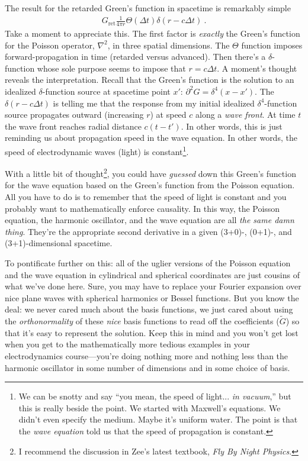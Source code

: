 The result for the retarded Green's function in spacetime is remarkably simple
\begin{align}
	G_\text{ret} \frac{1}{4\pi r} \Theta(\Delta t) \delta(r-c\Delta t) \ .
\end{align}
Take a moment to appreciate this. The first factor is \emph{exactly} the Green's function for the Poisson operator, $\nabla^2$, in three spatial dimensions. The $\Theta$ function imposes forward-propagation in time (retarded versus advanced). Then there's a $\delta$-function whose sole purpose seems to impose that $r = c\Delta t$. A moment's thought reveals the interpretation. Recall that the Green's function is the solution to an idealized $\delta$-function source at spacetime point $x'$: $\partial^2 G = \delta^4(x-x')$. The $\delta(r-c\Delta t)$ is telling me that the response from my initial idealized $\delta^4$-function source propagates outward (increasing $r$) at speed $c$ along a \emph{wave front}. At time $t$ the wave front reaches radial distance $c(t-t')$. In other words, this is just reminding us about propagation speed in the wave equation. In other words, the speed of electrodynamic waves (light) is constant\footnote{We can be snotty and say ``you mean, the speed of light... \emph{in vacuum},'' but this is really beside the point. We started with Maxwell's equations. We didn't even specify the medium. Maybe it's uniform water. The point is that the \emph{wave equation} told us that the speed of propagation is constant.}. 

With a little bit of thought\footnote{I recommend the discussion in Zee's latest textbook, \emph{Fly By Night Physics}.}, you could have \emph{guessed} down this Green's function for the wave equation based on the Green's function from the Poisson equation. All you have to do is to remember that the speed of light is constant and you probably want to mathematically enforce causality. In this way, the Poisson equation, the harmonic oscillator, and the wave equation are all \emph{the same damn thing}. They're the appropriate second derivative in a given (3+0)-, (0+1)-, and (3+1)-dimensional spacetime.

To pontificate further on this: all of the uglier versions of the Poisson equation and the wave equation in cylindrical and spherical coordinates are just cousins of what we've done here. Sure, you may have to replace your Fourier expansion over nice plane waves with spherical harmonics or Bessel functions. But you know the deal: we never cared much about the basis functions, we just cared about using the \emph{orthonormality} of these \emph{nice} basis functions to read off the coefficients ($\tilde G$) so that it's easy to represent the solution. Keep this in mind and you won't get lost when you get to the mathematically more tedious examples in your electrodynamics course---you're doing nothing more and nothing less than the harmonic oscillator in some number of dimensions and in some choice of basis.

